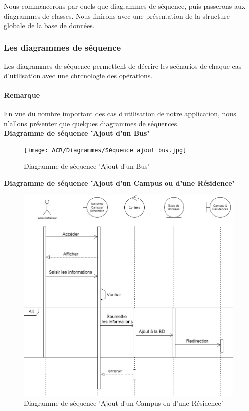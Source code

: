 Nous commencerons par quels que diagrammes de séquence, puis passerons aux diagrammes de classes. Nous finirons avec une présentation de la structure globale de la base de données.\\

\subsubsection{Les diagrammes de séquence}
Les diagrammes de séquence permettent de décrire les scénarios de chaque cas d'utilisation avec une chronologie des opérations.

\paragraph*{Remarque} En vue du nombre important des cas d'utilisation de notre application, nous n'allons présenter que quelques diagrammes de séquences.\\

\textbf{Diagramme de séquence 'Ajout d'un Bus'}
\begin{figure}[H]
    \centering
    \texttt{[image: ACR/Diagrammes/Séquence ajout bus.jpg]}
    \caption{Diagramme de séquence 'Ajout d'un Bus'}
\end{figure}

\textbf{Diagramme de séquence 'Ajout d'un Campus ou d'une Résidence'}
\begin{figure}[H]
    \centering
    \includegraphics[scale=0.55]{ACR/Diagrammes/Séquence Ajout campus&résidence.jpg}
    \caption{Diagramme de séquence 'Ajout d'un Campus ou d'une Résidence'}
\end{figure}

